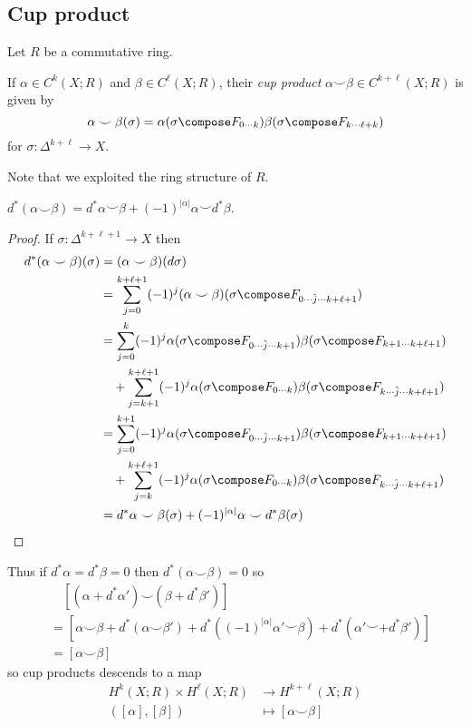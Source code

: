 \documentclass[a4paper]{article}
\newcommand*{\cp}{\smile} %
\begin{document}
\subsection{Cup product}

Let \(R\) be a commutative ring.

\begin{definition}
  If \(\alpha \in C^k(X; R)\) and \(\beta \in C^\ell(X; R)\), their \emph{cup product} \(\alpha \cp \beta \in C^{k + \ell}(X; R)\) is given by
  \[
    \alpha \cp \beta(\sigma) = \alpha(\sigma \compose F_{0 \cdots k}) \beta(\sigma \compose F_{k \cdots \ell + k})
  \]
  for \(\sigma: \Delta^{k + \ell} \to X\).
\end{definition}

Note that we exploited the ring structure of \(R\).

\begin{lemma}
  \(d^*(\alpha \cp \beta) = d^* \alpha \cp \beta + (-1)^{|\alpha|} \alpha \cp d^*\beta\).
\end{lemma}

\begin{proof}
  If \(\sigma: \Delta^{k + \ell + 1} \to X\) then
  \begin{align*}
    d^*(\alpha \cp \beta)(\sigma)
    &= (\alpha \cp \beta) (d\sigma) \\
    &= \sum_{j = 0}^{k + \ell + 1} (-1)^j (\alpha \cp \beta) (\sigma \compose F_{0 \cdots \hat j \cdots k + \ell + 1}) \\
    &= \sum_{j = 0}^k (-1)^j \alpha(\sigma \compose F_{0 \cdots \hat j \cdots k + 1}) \beta(\sigma \compose F_{k + 1 \cdots k + \ell + 1}) \\
    &\quad+ \sum_{j = k + 1}^{k + \ell + 1} (-1)^j \alpha(\sigma \compose F_{0 \cdots k}) \beta(\sigma \compose F_{k \cdots \hat j \cdots k + \ell + 1}) \\
    &= \sum_{j = 0}^{k + 1} (-1)^j \alpha(\sigma \compose F_{0 \cdots \hat j \cdots k + 1}) \beta(\sigma \compose F_{k + 1 \cdots k + \ell + 1}) \\
    &\quad+ \sum_{j = k}^{k + \ell + 1} (-1)^j \alpha(\sigma \compose F_{0 \cdots k}) \beta(\sigma \compose F_{k \cdots \hat j \cdots k + \ell + 1}) \\
    &= d^* \alpha \cp \beta (\sigma) + (-1)^{|\alpha|} \alpha \cp d^*\beta (\sigma)
  \end{align*}
\end{proof}

Thus if \(d^*\alpha = d^*\beta = 0\) then \(d^*(\alpha \cp \beta) = 0\) so
\begin{align*}
  &\quad [(\alpha + d^* \alpha') \cp (\beta + d^* \beta')] \\
  &= [\alpha \cp \beta + d^*(\alpha \cp \beta') + d^*((-1)^{|\alpha|} \alpha' \cp \beta) + d^*(\alpha' \cp + d^* \beta')] \\
  &= [\alpha \cp \beta]
\end{align*}
so cup products descends to a map
\begin{align*}
  H^k(X; R) \times H^\ell(X; R) &\to H^{k + \ell}(X; R) \\
  ([\alpha], [\beta]) &\mapsto [\alpha \cp \beta]
\end{align*}
\end{document}
